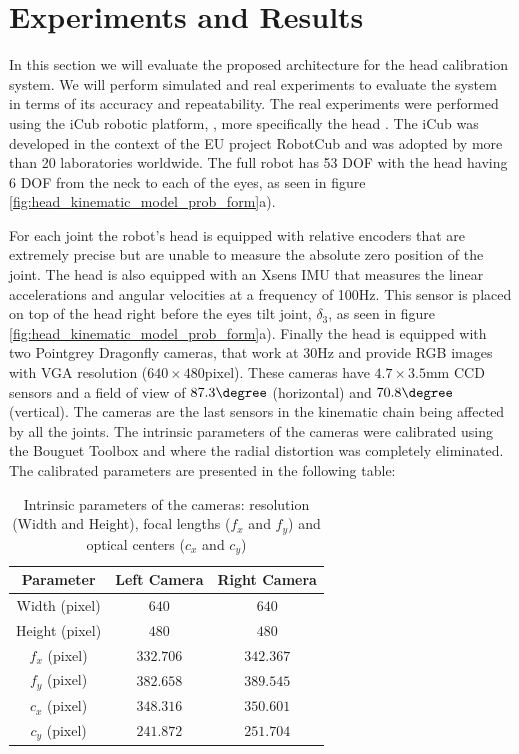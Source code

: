 \section{Experiments and Results}\label{sec:experiments_results}

In this section we will evaluate the proposed architecture for the head calibration system. We will perform simulated and real experiments to evaluate the system in terms of its accuracy and repeatability. The real experiments were performed using the iCub robotic platform, \cite{Metta08}, more specifically the head \cite{Beira06}. The iCub was developed in the context of the EU project RobotCub and was adopted by more than 20 laboratories worldwide. The full robot has 53 DOF with the head having 6 DOF from the neck to each of the eyes, as seen in figure \ref{fig:head_kinematic_model_prob_form}a).

For each joint the robot's head is equipped with relative encoders that are extremely precise but are unable to measure the absolute zero position of the joint. The head is also equipped with an Xsens IMU that measures the linear accelerations and angular velocities at a frequency of 100Hz. This sensor is placed on top of the head right before the eyes tilt joint, $\delta_3$, as seen in figure \ref{fig:head_kinematic_model_prob_form}a). Finally the head is equipped with two Pointgrey Dragonfly cameras, that work at 30Hz and provide RGB images with VGA resolution ($640\times480$pixel). These cameras have $4.7\times3.5$mm CCD sensors and a field of view of $87.3\degree$ (horizontal) and $70.8\degree$ (vertical). The cameras are the last sensors in the kinematic chain being affected by all the joints. The intrinsic parameters of the cameras were calibrated using the Bouguet Toolbox \cite{Bouguet08} and where the radial distortion was completely eliminated. The calibrated parameters are presented in the following table:

\begin{table}
\centering
\begin{tabular}{ccc}
 \hline
 Parameter & Left Camera & Right Camera \\
 \hline
 Width (pixel) & $640$ & $640$\\
 Height (pixel) & $480$ & $480$ \\
 $f_x$ (pixel) & $332.706$ & $342.367$\\
 $f_y$ (pixel) & $382.658$ & $389.545$\\
 $c_x$ (pixel) & $348.316$ & $350.601$\\
 $c_y$ (pixel) & $241.872$ & $251.704$\\
 \hline
\end{tabular}
\caption{Intrinsic parameters of the cameras: resolution (Width and Height), focal lengths ($f_x$ and $f_y$) and optical centers ($c_x$ and $c_y$)}
\label{tab:intrinsic_parameters}
\end{table}

